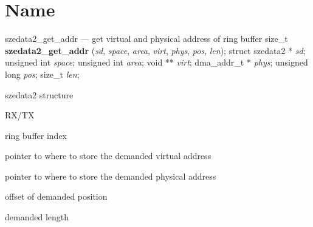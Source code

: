 \section*{Name}
szedata2\_get\_addr --- get virtual and physical address of ring buffer\label{id245277}
\label{id245282}size\_t \textbf{ szedata2\_get\_addr } ({\ttfamily\itshape{{sd}}}, {\ttfamily\itshape{{space}}}, {\ttfamily\itshape{{area}}}, {\ttfamily\itshape{{virt}}}, {\ttfamily\itshape{{phys}}}, {\ttfamily\itshape{{pos}}}, {\ttfamily\itshape{{len}}});
	\newline
	struct szedata2 * {\ttfamily\itshape{{sd}}};
	\newline
	unsigned int {\ttfamily\itshape{{space}}};
	\newline
	unsigned int {\ttfamily\itshape{{area}}};
	\newline
	void ** {\ttfamily\itshape{{virt}}};
	\newline
	dma\_addr\_t * {\ttfamily\itshape{{phys}}};
	\newline
	unsigned long {\ttfamily\itshape{{pos}}};
	\newline
	size\_t {\ttfamily\itshape{{len}}};
\label{id245346}

\begin{kdocdescription}
\item[{{\ttfamily\itshape{{sd}}}}]
szedata2 structure
\item[{{\ttfamily\itshape{{space}}}}]
RX/TX
\item[{{\ttfamily\itshape{{area}}}}]
ring buffer index
\item[{{\ttfamily\itshape{{virt}}}}]
pointer to where to store the demanded virtual address
\item[{{\ttfamily\itshape{{phys}}}}]
pointer to where to store the demanded physical address
\item[{{\ttfamily\itshape{{pos}}}}]
offset of demanded position
\item[{{\ttfamily\itshape{{len}}}}]
demanded length
\end{kdocdescription}
\noindent 
{}
\label{id245467}

